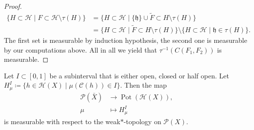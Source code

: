 \begin{proof}
  \begin{align*}
    \{H \subset \mathcal{H} \mid F \subset \mathcal{H} \setminus \tau(H)\}
    & = \{H \subset \mathcal{H} \mid \{\mathfrak{h}\} \cup \tilde F \subset H \setminus \tau(H)\}\\
    & = \{H \subset \mathcal{H} \mid \tilde{F} \subset H \setminus \tau(H)\} \setminus \{H \subset \mathcal{H} \mid \mathfrak{h} \in \tau(H)\}.
  \end{align*}
  The first set is measurable by induction hypothesis, the second one is measurable by our computations above. All in all we yield that \(\tau^{-1}(C(F_1, F_2))\) is measurable.
\end{proof}


\begin{lemma}[{\cites[Lemma~ A.1]{MR3509968}}]
  \label{lem:measurable-mu}
  Let \(I \subset [0,1]\) be a subinterval that is either open, closed or half open. Let \(H^I_\mu \coloneqq \{h \in \mathcal{H}(X) \mid \mu(\mathcal{C}(h)) \in I\}\). Then the map
  \begin{align*}
    \mathcal{P}(\bar X) &\to \operatorname{Pot}(\mathcal{H}(X)),\\
    \mu &\mapsto H^I_\mu
  \end{align*}
  is measurable with respect to the weak\(\ast\)-topology on \(\mathcal{P}(X)\).
\end{lemma}

